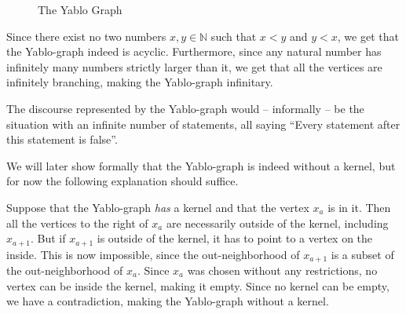 \begin{figure}[!h]
  \centering
  \caption{The Yablo Graph}
  \label{fig:yablo-graph}
\end{figure}
Since there exist no two numbers $x,y \in \mathbb{N}$ such that $x < y$ and $y < x$, we get that the Yablo-graph indeed is acyclic.
Furthermore, since any natural number has infinitely many numbers strictly larger than it, we get that all the vertices are infinitely branching, making the Yablo-graph infinitary.

The discourse represented by the Yablo-graph would -- informally -- be the situation with an infinite number of statements, all saying ``Every statement after this statement is false''.

We will later show formally that the Yablo-graph is indeed without a kernel, but for now the following explanation should suffice.

Suppose that the Yablo-graph \textit{has} a kernel and that the vertex $x_a$ is in it.
Then all the vertices to the right of $x_a$ are necessarily outside of the kernel, including $x_{a+1}$.
But if $x_{a+1}$ is outside of the kernel, it has to point to a vertex on the inside.
This is now impossible, since the out-neighborhood of $x_{a+1}$ is a subset of the out-neighborhood of $x_a$.
Since $x_a$ was chosen without any restrictions, no vertex can be inside the kernel, making it empty.
Since no kernel can be empty, we have a contradiction, making the Yablo-graph without a kernel.


